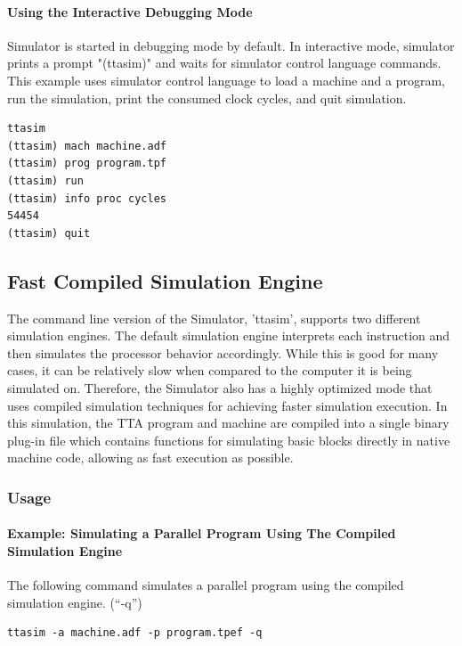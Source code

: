 \documentclass[a4paper,twoside]{tceusermanual}
\begin{document}
\paragraph{Using the Interactive Debugging Mode}

Simulator is started in debugging mode by default. In interactive mode,
simulator prints a prompt "(ttasim)" and waits for simulator control language
commands. This example uses simulator control language to load a machine and a
program, run the simulation, print the consumed clock cycles, and quit
simulation.

\begin{verbatim}
ttasim
(ttasim) mach machine.adf
(ttasim) prog program.tpf
(ttasim) run
(ttasim) info proc cycles
54454
(ttasim) quit
\end{verbatim}

\subsection{Fast Compiled Simulation Engine}

The command line version of the Simulator, 'ttasim', supports two
different simulation engines. The default simulation engine interprets each
instruction and then simulates the processor behavior accordingly. While this is
good for many cases, it can be relatively slow when compared to the computer it
is being simulated on. Therefore, the Simulator also has a highly optimized 
mode that uses compiled simulation techniques for achieving faster simulation
execution. In this simulation, the TTA program and machine are compiled
into a single binary plug-in file which contains functions for simulating basic
blocks directly in native machine code, allowing as fast execution as possible.

\subsubsection{Usage}

\paragraph{Example: Simulating a Parallel Program Using The Compiled Simulation
Engine}

The following command simulates a parallel program using the compiled
simulation engine. (``-q'')

\begin{verbatim}
ttasim -a machine.adf -p program.tpef -q
\end{verbatim}
\end{document}
